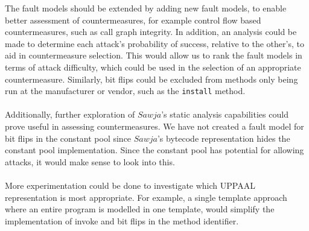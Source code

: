 
The fault models should be extended by adding new fault models, to enable better assessment of countermeasures, for example control flow based countermeasures, such as call graph integrity. In addition, an analysis could be made to determine each attack's probability of success, relative to the other's, to aid in countermeasure selection. This would allow us to rank the fault models in terms of attack difficulty, which could be used in the selection of an appropriate countermeasure. Similarly, bit flips could be excluded from methods only being run at the manufacturer or vendor, such as the \texttt{install} method.\\\\
Additionally, further exploration of $Sawja$'s static analysis capabilities could prove useful in assessing countermeasures. We have not created a fault model for bit flips in the constant pool since $Sawja$'s bytecode representation hides the constant pool implementation. Since the constant pool has potential for allowing attacks, it would make sense to look into this.\\\\
More experimentation could be done to investigate which UPPAAL representation is most appropriate. For example, a single template approach where an entire program is modelled in one template, would simplify  the implementation of invoke and bit flips in the method identifier.
